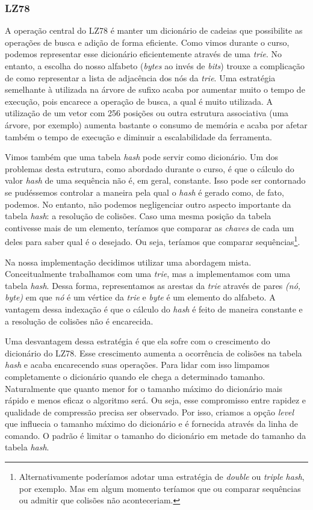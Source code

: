 \documentclass[]{article}
\begin{document}
\subsubsection{LZ78}

A operação central do LZ78 é manter um dicionário de cadeias que possibilite as operações de busca e adição de forma eficiente. Como vimos durante o curso, podemos representar esse dicionário eficientemente através de uma \textit{trie}. No entanto, a escolha do nosso alfabeto (\textit{bytes} ao invés de \textit{bits}) trouxe a complicação de como representar a lista de adjacência dos nós da \textit{trie}. Uma estratégia semelhante à utilizada na árvore de sufixo acaba por aumentar muito o tempo de execução, pois encarece a operação de busca, a qual é muito utilizada. A utilização de um vetor com 256 posições ou outra estrutura associativa (uma árvore, por exemplo) aumenta bastante o consumo de memória e acaba por afetar também o tempo de execução e diminuir a escalabilidade da ferramenta.

Vimos também que uma tabela \textit{hash} pode servir como dicionário. Um dos problemas desta estrutura, como abordado durante o curso, é que o cálculo do valor \textit{hash} de uma sequência não é, em geral, constante. Isso pode ser contornado se pudéssemos controlar a maneira pela qual o \textit{hash} é gerado como, de fato, podemos. No entanto, não podemos negligenciar outro aspecto importante da tabela \textit{hash}: a resolução de colisões. Caso uma mesma posição da tabela contivesse mais de um elemento, teríamos que comparar as \textit{chaves} de cada um deles para saber qual é o desejado. Ou seja, teríamos que comparar sequências\footnote{Alternativamente poderíamos adotar uma estratégia de \textit{double} ou \textit{triple} \textit{hash}, por exemplo. Mas em algum momento teríamos que ou comparar sequências ou admitir que colisões não aconteceriam.}.

Na nossa implementação decidimos utilizar uma abordagem mista. Conceitualmente trabalhamos com uma \textit{trie}, mas a implementamos com uma tabela \textit{hash}. Dessa forma, representamos as arestas da \textit{trie} através de pares \textit{(nó, byte)} em que \textit{nó} é um vértice da \textit{trie} e \textit{byte} é um elemento do alfabeto. A vantagem dessa indexação é que o cálculo do \textit{hash} é feito de maneira constante e a resolução de colisões não é encarecida.

Uma desvantagem dessa estratégia é que ela sofre com o crescimento do dicionário do LZ78. Esse crescimento aumenta a ocorrência de colisões na tabela \textit{hash} e acaba encarecendo suas operações. Para lidar com isso limpamos completamente o dicionário quando ele chega a determinado tamanho. Naturalmente que quanto menor for o tamanho máximo do dicionário mais rápido e menos eficaz o algoritmo será. Ou seja, esse compromisso entre rapidez e qualidade de compressão precisa ser observado. Por isso, criamos a opção \textit{level} que influecia o tamanho máximo do dicionário e é fornecida através da linha de comando. O padrão é limitar o tamanho do dicionário em metade do tamanho da tabela \textit{hash}.
\end{document}

